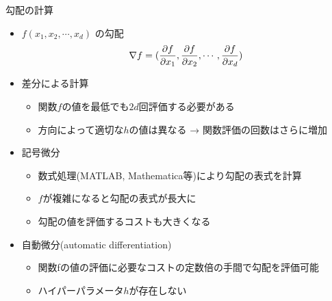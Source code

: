 \begin{frame}[t,fragile]{勾配の計算}
  \begin{itemize}
  \item $f(x_1,x_2,\cdots,x_d)$ の勾配
    \[
      \nabla f = \Large( \frac{\partial f}{\partial x_1}, \frac{\partial f}{\partial x_2}, \cdots, \frac{\partial f}{\partial x_d} \Large)
    \]
  \item 差分による計算
    \begin{itemize}
      \item 関数$f$の値を最低でも$2d$回評価する必要がある
      \item 方向によって適切な$h$の値は異なる → 関数評価の回数はさらに増加
    \end{itemize}
  \item 記号微分
    \begin{itemize}
      \item 数式処理(MATLAB, Mathematica等)により勾配の表式を計算
      \item $f$が複雑になると勾配の表式が長大に
      \item 勾配の値を評価するコストも大きくなる
    \end{itemize}
  \item 自動微分(automatic differentiation)
    \begin{itemize}
      \item 関数fの値の評価に必要なコストの定数倍の手間で勾配を評価可能
      \item ハイパーパラメータ$h$が存在しない
    \end{itemize}
  \end{itemize}
\end{frame}
